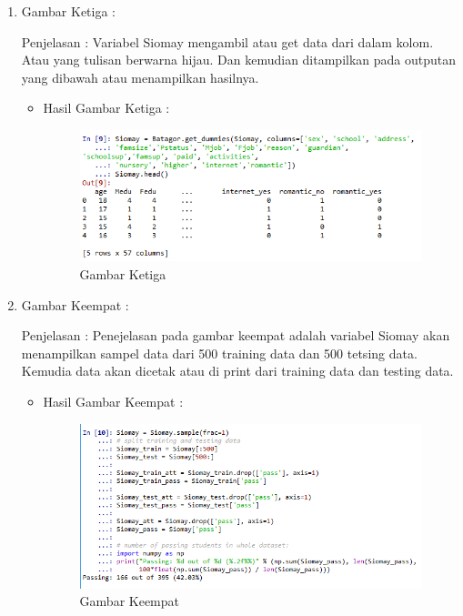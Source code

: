 \begin{itemize}
\begin{enumerate}
\begin{itemize}
\end{itemize}
\par
\item  Gambar Ketiga :
\par Penjelasan : Variabel Siomay mengambil atau get data dari dalam kolom. Atau yang tulisan berwarna hijau. Dan kemudian ditampilkan pada outputan yang dibawah atau menampilkan hasilnya.
\par 
\begin{itemize}
\par
\item Hasil  Gambar Ketiga :

\begin{figure}[!hbtp]
\centering
\includegraphics[scale=0.5]{figures/AIP/jd3.PNG}
\caption{ Gambar Ketiga}
\label{3}
\end{figure}

\end{itemize}
\par
\item  Gambar Keempat :
\par Penjelasan : Penejelasan pada gambar keempat adalah variabel Siomay akan menampilkan sampel data dari 500 training data dan 500 tetsing data. Kemudia data akan dicetak atau di print dari training data dan testing data.
\par 
\begin{itemize}
\par
\item Hasil  Gambar Keempat :

\begin{figure}[!hbtp]
\centering
\includegraphics[scale=0.5]{figures/AIP/jd4.PNG}
\caption{ Gambar Keempat}
\label{4}
\end{figure}


\end{itemize}
\end{enumerate}
\end{itemize}
